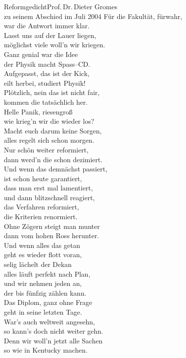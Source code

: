 \begin{lied*}{Reformgedicht}{Prof.\,Dr.\,Dieter Gromes\\zu seinem Abschied im Juli 2004}
Für die Fakultät, fürwahr,\\
war die Antwort immer klar.\\
\glqq Lasst uns auf der Lauer liegen,\\
möglichst viele woll'n wir kriegen.\grqq\\
Ganz genial war die Idee\\
der \glqq Physik macht Spass\grqq--CD.\\
\glqq Aufgepasst, das ist der Kick,\\
eilt herbei, studiert Physik!\grqq\\

Plötzlich, nein das ist nicht fair,\\
kommen die tatsächlich her.\\
Helle Panik, riesengroß\\
wie krieg'n wir die wieder los?\\

Macht euch darum keine Sorgen,\\
alles regelt sich schon morgen.\\
Nur schön weiter reformiert,\\
dann werd'n die schon dezimiert.\\
Und wenn das demnächst passiert,\\
ist schon heute garantiert,\\
dass man erst mal lamentiert,\\
und dann blitzschnell reagiert,\\
das Verfahren reformiert,\\
die Kriterien renormiert.\\

Ohne Zögern steigt man munter\\
dann vom hohen Ross herunter.\\
Und wenn alles das getan\\
geht es wieder flott voran,\\
selig lächelt der Dekan\\
alles läuft perfekt nach Plan,\\
und wir nehmen jeden an,\\
der bis fünfzig zählen kann.\\

Das Diplom, ganz ohne Frage\\
geht in seine letzten Tage.\\
War's auch weltweit angesehn,\\
so kann's doch nicht weiter gehn.\\
Denn wir woll'n jetzt alle Sachen\\
so wie in Kentucky machen.\\


\end{lied*}
